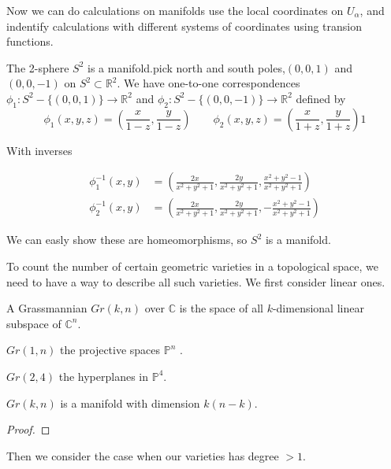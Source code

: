 \documentclass{article}
\begin{document}
Now we can do calculations on manifolds use the local coordinates on $U_{\alpha}$, 
and indentify calculations with different systems of coordinates using transion functions.

\begin{eg}
    The 2-sphere $S^{2}$ is a manifold.pick north and south poles,$(0,0,1)$ 
    and $(0,0,-1)$ on $S^{2} \subset \mathbb{R}^{2}$. We have one-to-one correspondences
    $\phi_{1} : S^{2}- \{(0,0,1)\} \longrightarrow \mathbb{R}^{2} $ and 
    $\phi_{2} : S^{2}- \{(0,0,-1)\} \longrightarrow \mathbb{R}^{2}$ defined by\\
    
    \[
    \phi_{1}(x,y,z) = (\frac{x}{1-z},\frac{y}{1-z}) \qquad 
    \phi_{2}(x,y,z) = (\frac{x}{1+z},\frac{y}{1+z})1
    \]

    With inverses
    
    \begin{align*}
    \phi_{1}^{-1}(x,y) & = {}(\frac{2x}{x^{2}+y^{2}+1},\frac{2y}{x^{2}+y^{2}+1},\frac{x^{2}+y^{2}-1}{x^{2}+y^{2}+1}) \\
    \phi_{2}^{-1}(x,y) & = {}(\frac{2x}{x^{2}+y^{2}+1},\frac{2y}{x^{2}+y^{2}+1},-\frac{x^{2}+y^{2}-1}{x^{2}+y^{2}+1})
    \end{align*}
 
    We can easly show these are homeomorphisms, so $S^{2}$ is a manifold.
\end{eg}

To count the number of certain geometric varieties in a topological space, we need to have a way to describe 
all such varieties. We first consider linear ones.
\begin{df}
A Grassmannian $Gr(k,n)$ over $\mathbb{C}$ is the space of all $k$-dimensional 
linear subspace of $\mathbb{C}^{n}$. 
\end{df}

\begin{eg}
$Gr(1,n)$ the projective spaces $\mathbb{P}^{n}$ .
\end{eg}

\begin{eg}
$Gr(2,4)$ the hyperplanes in $\mathbb{P}^{4}$.
\end{eg}

\begin{thm}
$Gr(k,n)$ is a manifold with dimension $k(n-k) $. 
\end{thm}
\begin{proof}

\end{proof}
Then we consider the case when our varieties has degree $> 1$.
\end{document}
